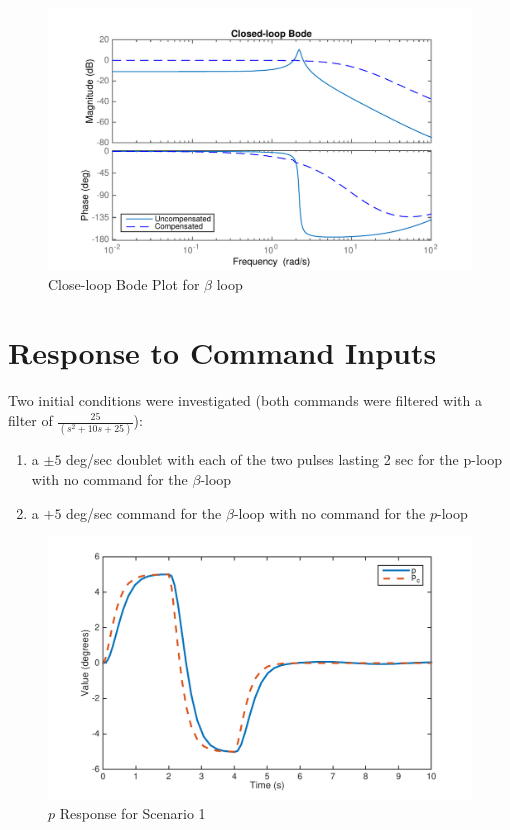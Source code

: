 \documentclass[11pt]{article}
\begin{document}
\begin{figure}[h!]
\begin{center}
\includegraphics[height=.4\textheight]{figures/closeloop_beta}
\caption{Close-loop Bode Plot for $\beta$ loop}
\end{center}
\end{figure}

\clearpage
\section{Response to Command Inputs}
Two initial conditions were investigated (both commands were filtered with a filter of $\frac{25}{(s^2 + 10s + 25)}$):
\begin{enumerate}
\item a $\pm 5$ deg/sec doublet with each of the two pulses lasting 2 sec for the p-loop with no command for the $\beta$-loop
\item a $+ 5$ deg/sec command for the $\beta$-loop with no command for the $p$-loop\\
\end{enumerate}


\begin{figure}[h!]
\begin{center}
\includegraphics[height=.425\textheight]{figures/p2}
\caption{$p$ Response for Scenario 1}
\end{center}
\end{figure}
\end{document}
